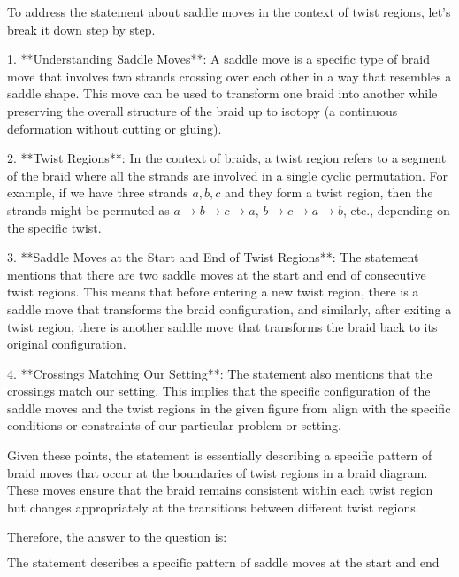 To address the statement about saddle moves in the context of twist regions, let's break it down step by step.

1. **Understanding Saddle Moves**: A saddle move is a specific type of braid move that involves two strands crossing over each other in a way that resembles a saddle shape. This move can be used to transform one braid into another while preserving the overall structure of the braid up to isotopy (a continuous deformation without cutting or gluing).

2. **Twist Regions**: In the context of braids, a twist region refers to a segment of the braid where all the strands are involved in a single cyclic permutation. For example, if we have three strands \(a, b, c\) and they form a twist region, then the strands might be permuted as \(a \to b \to c \to a\), \(b \to c \to a \to b\), etc., depending on the specific twist.

3. **Saddle Moves at the Start and End of Twist Regions**: The statement mentions that there are two saddle moves at the start and end of consecutive twist regions. This means that before entering a new twist region, there is a saddle move that transforms the braid configuration, and similarly, after exiting a twist region, there is another saddle move that transforms the braid back to its original configuration.

4. **Crossings Matching Our Setting**: The statement also mentions that the crossings match our setting. This implies that the specific configuration of the saddle moves and the twist regions in the given figure from \cite[Figure 3]{BKLMR} align with the specific conditions or constraints of our particular problem or setting.

Given these points, the statement is essentially describing a specific pattern of braid moves that occur at the boundaries of twist regions in a braid diagram. These moves ensure that the braid remains consistent within each twist region but changes appropriately at the transitions between different twist regions.

Therefore, the answer to the question is:

\[
\boxed{\text{The statement describes a specific pattern of saddle moves at the start and end of consecutive twist regions in a braid diagram, ensuring consistency within each twist region and appropriate transitions between them.}}
\]